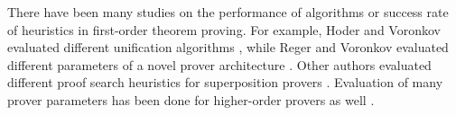 There have been many studies on the performance of algorithms or success rate of
heuristics in first-order theorem proving. For example, Hoder and Voronkov
evaluated different unification algorithms \cite{hv-09-unifalgs}, while Reger and
Voronkov evaluated different parameters of a novel prover architecture
\cite{rsv-15-playing-with-avatar}. Other authors evaluated different proof
search heuristics for superposition provers \cite{gs-20-clausesel,
hrsv-16-selsel, sm-16-clausesel}. Evaluation of many prover parameters has been
done for higher-order provers as well
\cite{benzmueller-et-al-05-can-ho-fo-coop,fb-2016-internal-guidance-satallax,sb-15-beta,wskb-16-effective-norm}.
